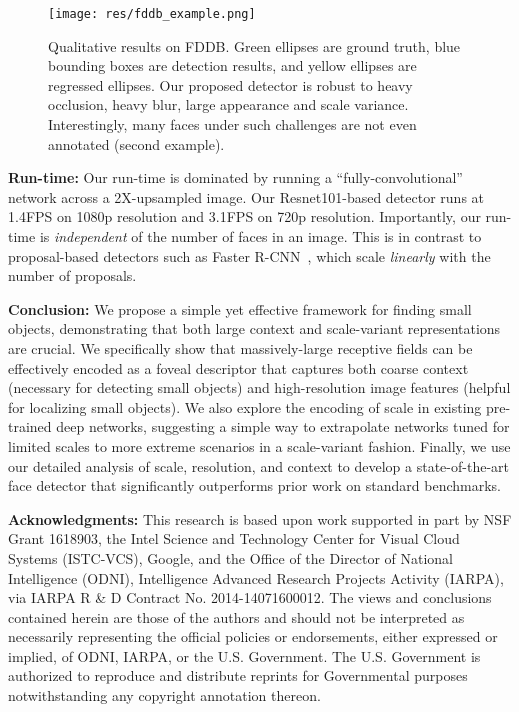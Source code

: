 \documentclass[10pt,twocolumn,letterpaper]{article}
\begin{document}
\begin{figure*}
  \centering
  \texttt{[image: res/fddb\_example.png]}
  \caption{Qualitative results on FDDB. Green ellipses are ground truth, blue bounding boxes are detection results, and yellow ellipses are regressed ellipses. Our proposed detector is robust to heavy occlusion, heavy blur, large appearance and scale variance. Interestingly, many faces under such challenges are not even annotated (second example).}
  \label{fig:fddb-example}
\end{figure*}

{\bf Run-time:} Our run-time is dominated by running a ``fully-convolutional'' network across a 2X-upsampled image. Our Resnet101-based detector runs at 1.4FPS on 1080p resolution and 3.1FPS on 720p resolution. Importantly, our run-time is {\em independent} of the number of faces in an image. This is in contrast to proposal-based detectors such as Faster R-CNN~\cite{ren2015faster}, which scale {\em linearly} with the number of proposals.






















{\bf Conclusion:} We propose a simple yet effective framework for finding small objects, demonstrating that both large context and scale-variant representations are crucial.  We specifically show that massively-large receptive fields can be effectively encoded as a foveal descriptor that captures both coarse context (necessary for detecting small objects) and high-resolution image features (helpful for localizing small objects).
We also explore the encoding of scale in existing pre-trained deep networks, suggesting a simple way to extrapolate networks tuned for limited scales to more extreme scenarios in a scale-variant fashion. Finally, we use our detailed analysis of scale, resolution, and context to develop a state-of-the-art face detector that significantly outperforms prior work on standard benchmarks.


{\bf Acknowledgments:} This research is based upon work supported in part by NSF Grant 1618903, the Intel Science and Technology Center for Visual Cloud Systems (ISTC-VCS), Google, and the Office of the Director of National Intelligence (ODNI), Intelligence Advanced Research Projects Activity (IARPA), via IARPA R \& D Contract No. 2014-14071600012. The views and conclusions contained herein are those of the authors and should not be interpreted as necessarily representing the official policies or endorsements, either expressed or implied, of ODNI, IARPA, or the U.S. Government. The U.S. Government is authorized to reproduce and distribute reprints for Governmental purposes notwithstanding any copyright annotation thereon.
\end{document}
